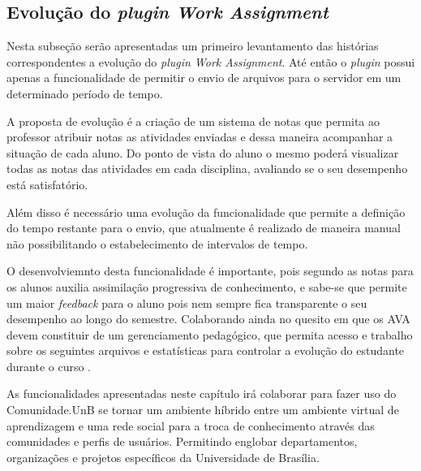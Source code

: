 \subsection{Evolução do \textit{plugin Work Assignment}}

Nesta subseção serão apresentadas um primeiro levantamento das histórias correspondentes a evolução do \textit{plugin Work Assignment}. Até então o \textit{plugin} possui apenas a funcionalidade de permitir o envio de arquivos para o servidor em um determinado período de tempo.

A proposta de evolução é a criação de um sistema de notas que permita ao professor atribuir notas as atividades enviadas e dessa maneira acompanhar a situação de cada aluno. Do ponto de vista do aluno o mesmo poderá visualizar todas as notas das atividades em cada disciplina, avaliando se o seu desempenho está satisfatório.

Além disso é necessário uma evolução da funcionalidade que permite a definição do tempo restante para o envio, que atualmente é realizado de maneira manual não possibilitando o estabelecimento de intervalos de tempo.



O desenvolviemnto desta funcionalidade é importante, pois segundo  as notas para os alunos auxilia assimilação progressiva de conhecimento, e sabe-se que permite um maior \textit{feedback} para o aluno pois nem sempre fica transparente o seu desempenho ao longo do semestre. Colaborando ainda no quesito em que os AVA devem constituir de um gerenciamento pedagógico, que permita acesso e trabalho sobre os seguintes arquivos e estatísticas para controlar a evolução do estudante durante o curso \cite{pereira2007ambientes}.

As funcionalidades apresentadas neste capítulo irá colaborar para fazer uso do Comunidade.UnB se tornar um ambiente híbrido entre um ambiente virtual de aprendizagem e uma rede social para a troca de conhecimento através das comunidades e perfis de usuários. Permitindo englobar departamentos, organizações e projetos específicos da Universidade de Brasília.